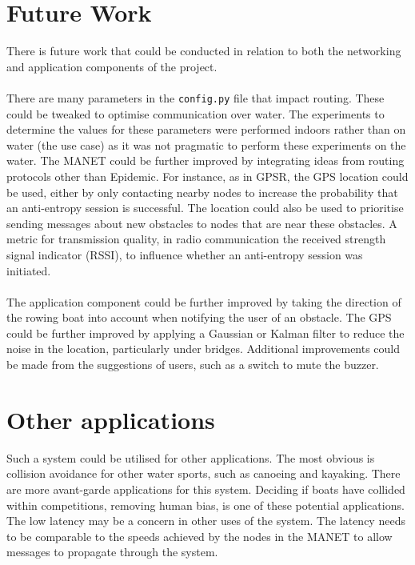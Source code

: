 \documentclass[12pt,a4paper]{report}
\begin{document}
{\section{Future Work}
There is future work that could be conducted in relation to both the networking and application components of the project. \\ \\
There are many parameters in the \verb'config.py' file that impact routing. These could be tweaked to optimise communication over water. The experiments to determine the values for these parameters were performed indoors rather than on water (the use case) as it was not pragmatic to perform these experiments on the water.
The MANET could be further improved by integrating ideas from routing protocols other than Epidemic. For instance, as in GPSR, the GPS location could be used, either by only contacting nearby nodes to increase the probability that an anti-entropy session is successful. The location could also be used to prioritise sending messages about new obstacles to nodes that are near these obstacles.  A metric for transmission quality, in radio communication the received strength signal indicator (RSSI), to influence whether an anti-entropy session was initiated. \\ \\ 
The application component could be further improved by taking the direction of the rowing boat into account when notifying the user of an obstacle. The GPS could be further improved by applying a Gaussian or Kalman filter to reduce the noise in the location, particularly under bridges. Additional improvements could be made from the suggestions of users, such as a switch to mute the buzzer. \\

\section{Other applications}
Such a system could be utilised for other applications. The most obvious is collision avoidance for other water sports, such as canoeing and kayaking. There are more avant-garde applications for this system. Deciding if boats have collided within competitions, removing human bias, is one of these potential applications. The low latency may be a concern in other uses of the system. The latency needs to be comparable to the speeds achieved by the nodes in the MANET to allow messages to propagate through the system.





}
\end{document}
